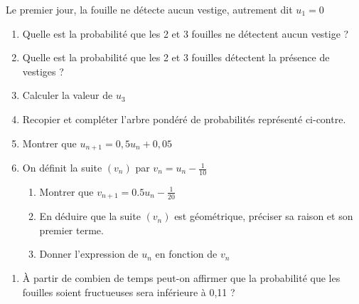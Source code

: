\documentclass[oneside,12pt]{book}          %
\begin{document}
Le premier jour, la fouille ne détecte aucun vestige, autrement dit $u_1=0$

\begin{minipage}{0.6\linewidth}
\begin{enumerate}
	\item Quelle est la probabilité que les 2 et 3 fouilles ne détectent aucun vestige ?
	\item Quelle est la probabilité que les 2 et 3 fouilles détectent la présence de vestiges ?
	\item Calculer la valeur de $u_3$
	\item Recopier et compléter l'arbre pondéré de probabilités représenté ci-contre.
	\item Montrer que $u_{n+1}=0,5u_n+0,05$
	\item On définit la suite $(v_n)$ par $v_n=u_n-\frac{1}{10}$
	\begin{enumerate}
		\item Montrer que $v_{n+1}=0.5u_n-\frac{1}{20}$
		\item En déduire que la suite $(v_n)$ est géométrique, préciser sa raison et son premier terme.
		\item Donner l'expression de $u_n$ en fonction de $v_n$
	\end{enumerate}
\end{enumerate}
\end{minipage}
\begin{minipage}{0.39\textwidth}
\end{minipage}
\begin{enumerate}
	\item[\faCalculator] À partir de combien de temps peut-on affirmer que la probabilité que les fouilles soient fructueuses sera inférieure à 0,11 ?
\end{enumerate}
\end{document}
